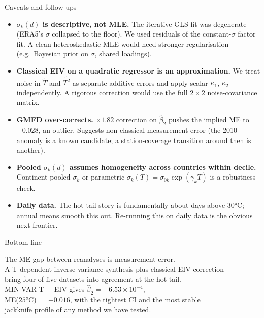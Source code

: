 \documentclass[10pt,aspectratio=169]{beamer}
\begin{document}
\begin{frame}{Caveats and follow-ups}
  \begin{itemize}
    \item \textbf{$\sigma_k(d)$ is descriptive, not MLE.} The iterative GLS
          fit was degenerate (ERA5's $\sigma$ collapsed to the floor). We
          used residuals of the constant-$\sigma$ factor fit. A clean
          heteroskedastic MLE would need stronger regularisation
          (e.g.\ Bayesian prior on $\sigma$, shared loadings).
    \item \textbf{Classical EIV on a quadratic regressor is an approximation.}
          We treat noise in $\widetilde T$ and $\widetilde{T^2}$ as separate
          additive errors and apply scalar $\kappa_1$, $\kappa_2$
          independently. A rigorous correction would use the full
          $2 \times 2$ noise-covariance matrix.
    \item \textbf{GMFD over-corrects.} $\times 1.82$ correction on
          $\hat\beta_2$ pushes the implied ME to $-0.028$, an outlier.
          Suggests non-classical measurement error (the 2010 anomaly is a
          known candidate; a station-coverage transition around then is
          another).
    \item \textbf{Pooled $\sigma_k(d)$ assumes homogeneity across countries
          within decile.} Continent-pooled $\sigma_k$ or parametric
          $\sigma_k(T) = \sigma_{0k}\exp(\gamma_k T)$ is a robustness check.
    \item \textbf{Daily data.} The hot-tail story is fundamentally about
          days above $30$°C; annual means smooth this out. Re-running this
          on daily data is the obvious next frontier.
  \end{itemize}
\end{frame}

\begin{frame}{Bottom line}
  \begin{center}
    \Large
    The ME gap between reanalyses is measurement error.\\[0.5em]
    A T-dependent inverse-variance synthesis plus classical EIV correction\\
    bring four of five datasets into agreement at the hot tail.\\[0.8em]
    \normalsize
    MIN-VAR-T + EIV gives $\hat\beta_2 = -6.53\times10^{-4}$,\\
    ME($25$°C) $= -0.016$, with the tightest CI and the most stable\\
    jackknife profile of any method we have tested.
  \end{center}
\end{frame}
\end{document}
